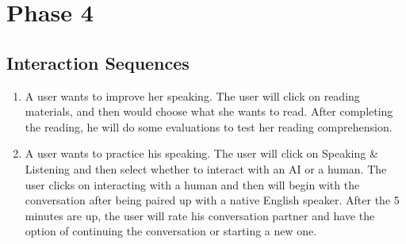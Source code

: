 \documentclass{sigchi}
\newcommand\tabhead[1]{\small\textbf{#1}}
\begin{document}



\section{Phase 4}


\subsection{Interaction Sequences}
\begin{enumerate}
\item A user wants to improve her speaking. The user will click on reading materials, and then would choose what she wants to read. After completing the reading, he will do some evaluations to test her reading comprehension.
\item A user wants to practice his speaking. The user will click on Speaking \& Listening and then select whether to interact with an AI or a human. The user clicks on interacting with a human and then will begin with the conversation after being paired up with a native English speaker. After the 5 minutes are up, the user will rate his conversation partner and have the option of continuing the conversation or starting a new one.
\end{enumerate}
\end{document}

